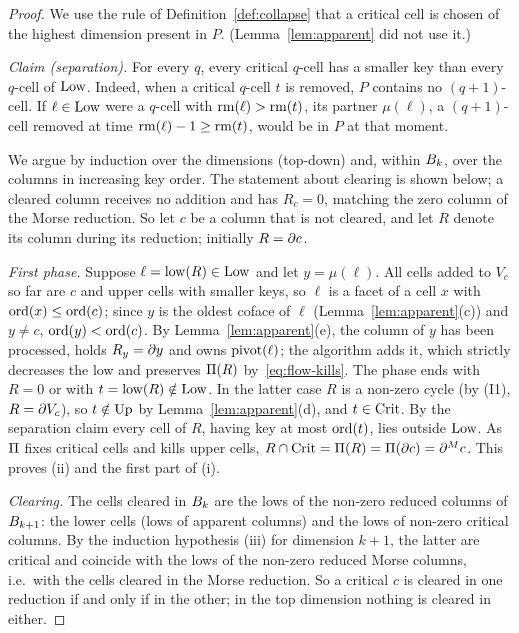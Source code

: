 \begin{proof}
We use the rule of Definition~\ref{def:collapse} that a critical cell is chosen
of the highest dimension present in $P$. (Lemma~\ref{lem:apparent} did not use
it.)

\emph{Claim (separation).} For every $q$, every critical $q$-cell has a smaller
key than every $q$-cell of $\mathrm{Low}$. Indeed, when a critical $q$-cell $t$ is removed,
$P$ contains no $(q+1)$-cell. If $\ell\in\mathrm{Low}$ were a $q$-cell with
$\operatorname{rm}(\ell)>\operatorname{rm}(t)$, its partner $\mu(\ell)$, a $(q+1)$-cell removed at time
$\operatorname{rm}(\ell)-1\ge\operatorname{rm}(t)$, would be in $P$ at that moment.

We argue by induction over the dimensions (top-down) and, within $B_{k}$, over
the columns in increasing key order. The statement about clearing is shown below;
a cleared column receives no addition and has $R_c=0$, matching the zero column
of the Morse reduction. So let $c$ be a column that is not cleared, and let $R$
denote its column during its reduction; initially $R=\partial c$.

\emph{First phase.} Suppose $\ell=\operatorname{low}(R)\in\mathrm{Low}$ and let $y=\mu(\ell)$. All cells
added to $V_c$ so far are $c$ and upper cells with smaller keys, so $\ell$ is a
facet of a cell $x$ with $\operatorname{ord}(x)\le\operatorname{ord}(c)$; since $y$ is the oldest coface of
$\ell$ (Lemma~\ref{lem:apparent}(c)) and $y\ne c$, $\operatorname{ord}(y)<\operatorname{ord}(c)$. By
Lemma~\ref{lem:apparent}(e), the column of $y$ has been processed, holds
$R_y=\partial y$ and owns $\operatorname{pivot}(\ell)$; the algorithm adds it, which
strictly decreases the low and preserves $\Pi(R)$ by~\eqref{eq:flow-kills}.
The phase ends with $R=0$ or with $t=\operatorname{low}(R)\notin\mathrm{Low}$. In the latter case $R$
is a non-zero cycle (by (I1), $R=\partial V_c$), so $t\notin\mathrm{Up}$ by
Lemma~\ref{lem:apparent}(d), and $t\in\mathrm{Crit}$. By the separation claim every
cell of $R$, having key at most $\operatorname{ord}(t)$, lies outside $\mathrm{Low}$. As $\Pi$ fixes
critical cells and kills upper cells,
$R\cap\mathrm{Crit}=\Pi(R)=\Pi(\partial c)=\partial^{M} c$. This proves (ii) and the first part
of (i).

\emph{Clearing.} The cells cleared in $B_{k}$ are the lows of the non-zero
reduced columns of $B_{k+1}$: the lower cells (lows of apparent columns) and
the lows of non-zero critical columns. By the induction hypothesis (iii) for
dimension $k+1$, the latter are critical and coincide with the lows of the
non-zero reduced Morse columns, i.e.\ with the cells cleared in the Morse
reduction. So a critical $c$ is cleared in one reduction if and only if in the
other; in the top dimension nothing is cleared in either.


\end{proof}
